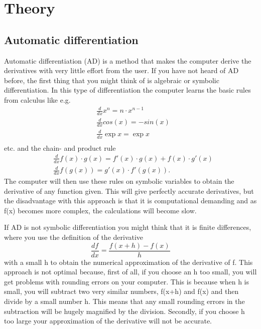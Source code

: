 \chapter{Theory}
\label{ch:theory}
\section{Automatic differentiation}
\label{sec:AD}
Automatic differentiation (AD) is a method that makes the computer derive the derivatives with very little effort from the user. If you have not heard of AD before, the first thing that you might think of is algebraic or symbolic differentiation. In this type of differentiation the computer learns the basic rules from calculus like e.g.
\begin{align*}
    &\frac{d}{dx}x^n     = n\cdot x^{n-1} \\
    &\frac{d}{dx}cos(x)  = -sin(x) \\
    &\frac{d}{dx}\exp{x} = \exp{x} \\
\end{align*}
etc. and the chain- and product rule
\begin{align*}
    &\frac{d}{dx}f(x)\cdot g(x) = f'(x)\cdot g(x) + f(x)\cdot g'(x) \\
    &\frac{d}{dx}f(g(x)) = g'(x)\cdot f'(g(x)).
\end{align*}
The computer will then use these rules on symbolic variables to obtain the derivative of any function given. This will give perfectly accurate derivatives, but the disadvantage with this approach is that it is computational demanding and as f(x) becomes more complex, the calculations will become slow.

If AD is not symbolic differentiation you might think that it is finite differences, where you use the definition of the derivative
\begin{equation*}
    \frac{df}{dx} = \frac{f(x+h) - f(x)}{h}
\end{equation*}
with a small h to obtain the numerical approximation of the derivative of f. This approach is not optimal because, first of all, if you choose an h too small, you will get problems with rounding errors on your computer. This is because when h is small, you will subtract two very similar numbers, f(x+h) and f(x) and then divide by a small number h. This means that any small rounding errors in the subtraction will be hugely magnified by the division. Secondly, if you choose h too large your approximation of the derivative will not be accurate. 

